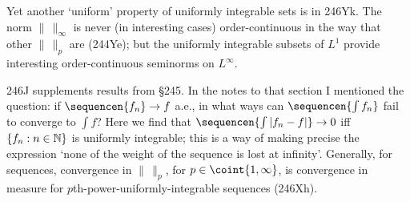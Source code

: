 {Yet another `uniform' property of uniformly integrable sets is in 246Yk.
The norm $\|\,\|_{\infty}$ is never (in interesting cases)
order-continuous in the way that other $\|\,\|_p$ are (244Ye);  but the
uniformly integrable subsets of $L^1$ provide interesting
order-continuous seminorms on $L^{\infty}$.

246J supplements results from \S245.   In the notes to that section I
mentioned the question:  if $\sequencen{f_n}\to f$ a.e., in what ways
can $\sequencen{\int f_n}$ fail to converge to $\int f$?   Here we find
that $\sequencen{\int|f_n-f|}\to 0$ iff $\{f_n:n\in\Bbb N\}$ is
uniformly integrable;  this is a way of making precise the expression
`none of the weight of the sequence is lost at infinity'.   Generally,
for sequences, convergence in $\|\,\|_p$, for $p\in\coint{1,\infty}$, is
convergence in measure for
$p$th-power-uniformly-integrable sequences (246Xh).




}%

\discrpage

